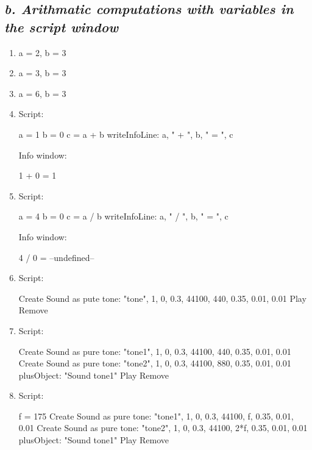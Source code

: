\documentclass[12pt, english]{article}
\begin{document}
\subsection*{\emph{b. Arithmatic computations with variables in the script window}}
\vspace{10pt}

\begin{enumerate}
  \item[1.] a = 2, b = 3 \par
  \item[2.] a = 3, b = 3 \par
  \item[3.] a = 6, b = 3 \par
  \item[4.] 
  Script:
  \begin{spverbatim}
    a = 1
    b = 0
    c = a + b
    writeInfoLine: a, " + ", b, " = ", c
  \end{spverbatim} \par
  Info window:
  \begin{spverbatim}
    1 + 0 = 1
  \end{spverbatim} \newpage
  \item[5.] 
  Script:
  \begin{spverbatim}
    a = 4
    b = 0
    c = a / b
    writeInfoLine: a, " / ", b, " = ", c
  \end{spverbatim}\par
  Info window:
  \begin{spverbatim}
    4 / 0 = --undefined--
  \end{spverbatim}
  \item[6.] Script:
  \begin{spverbatim}
    Create Sound as pute tone: "tone", 1, 0, 0.3, 44100, 440,
    0.35, 0.01, 0.01
    Play
    Remove
  \end{spverbatim}
  \item[7.] Script:
  \begin{spverbatim}
    Create Sound as pure tone: "tone1", 1, 0, 0.3, 44100,
    440, 0.35, 0.01, 0.01
    Create Sound as pure tone: "tone2", 1, 0, 0.3, 44100,
    880, 0.35, 0.01, 0.01
    plusObject: "Sound tone1"
    Play
    Remove
  \end{spverbatim}
  \item[8.] Script:
  \begin{spverbatim}
    f = 175
    Create Sound as pure tone: "tone1", 1, 0, 0.3, 44100, f,
    0.35, 0.01, 0.01
    Create Sound as pure tone: "tone2", 1, 0, 0.3, 44100, 2*f,
    0.35, 0.01, 0.01
    plusObject: "Sound tone1"
    Play
    Remove
  \end{spverbatim}
\end{enumerate}
\end{document}
